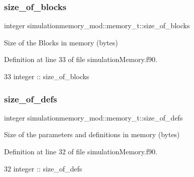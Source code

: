 \subsubsection{\texorpdfstring{size\+\_\+of\+\_\+blocks}{size\_of\_blocks}}
{\footnotesize\ttfamily integer simulationmemory\+\_\+mod\+::memory\+\_\+t\+::size\+\_\+of\+\_\+blocks\hspace{0.3cm}{\ttfamily [private]}}



Size of the Blocks in memory (bytes) 



Definition at line 33 of file simulation\+Memory.\+f90.


\begin{DoxyCode}
33         \textcolor{keywordtype}{integer} :: size\_of\_blocks
\end{DoxyCode}
\mbox{\label{structsimulationmemory__mod_1_1memory__t_ad73dd51ffc77c775c18706b4324db517}} 
\subsubsection{\texorpdfstring{size\+\_\+of\+\_\+defs}{size\_of\_defs}}
{\footnotesize\ttfamily integer simulationmemory\+\_\+mod\+::memory\+\_\+t\+::size\+\_\+of\+\_\+defs\hspace{0.3cm}{\ttfamily [private]}}



Size of the parameters and definitions in memory (bytes) 



Definition at line 32 of file simulation\+Memory.\+f90.


\begin{DoxyCode}
32         \textcolor{keywordtype}{integer} :: size\_of\_defs
\end{DoxyCode}
\mbox{\label{structsimulationmemory__mod_1_1memory__t_af6321367f42a24e0331c2e1da01f1367}} 
